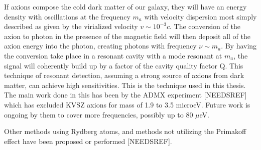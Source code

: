 \documentclass[11pt]{book}
\begin{document}
If axions compose the cold dark matter of our galaxy, they will have an energy density with oscillations at the frequency $m_a$ with velocity dispersion most simply described as given by the virialized velocity $v \sim 10^{-3}c$. The conversion of the axion to photon in the presence of the magnetic field will then deposit all of the axion energy into the photon, creating photons with frequency $\nu \sim m_a$. By having the conversion take place in a resonant cavity with a mode resonant at $m_a$, the signal will coherently build up by a factor of the cavity quality factor Q. This technique of resonant detection, assuming a strong source of axions from dark matter, can achieve high sensitivities. This is the technique used in this thesis. The main work done in this has been by the ADMX experiment [NEEDSREF] which has excluded KVSZ axions for mass of 1.9 to 3.5 microeV. Future work is ongoing by them to cover more frequencies, possibly up to 80 $\mu$eV.

Other methods using Rydberg atoms, and methods not utilizing the Primakoff effect have been proposed or performed [NEEDSREF].
\end{document}
